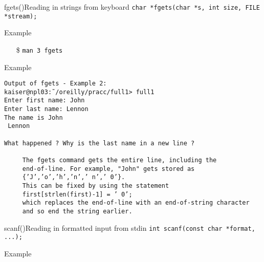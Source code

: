 \begin{frame}[fragile=singleslide]{fgets()}{Reading in strings from keyboard}
  \texttt{char *fgets(char *s, int size, FILE *stream);}
  \begin{block}{Example}
    \begin{center}
    \end{center}
  \end{block}
  \begin{itemize}
  \item[\$] \texttt{man 3 fgets}
  \end{itemize}
\end{frame}

\begin{frame}
  \begin{block}{Example}
    \begin{center}
    \end{center}
  \end{block}
\end{frame}

\begin{verbatim}
Output of fgets - Example 2:
kaiser@npl03:˜/oreilly/pracc/full1> full1
Enter first name: John
Enter last name: Lennon
The name is John
 Lennon

What happened ? Why is the last name in a new line ?

     The fgets command gets the entire line, including the
     end-of-line. For example, "John" gets stored as
     {’J’,’o’,’h’,’n’,’ n’,’ 0’}.
     This can be fixed by using the statement
     first[strlen(first)-1] = ’ 0’;
     which replaces the end-of-line with an end-of-string character
     and so end the string earlier.
\end{verbatim}

\begin{frame}[fragile=singleslide]{scanf()}{Reading in formatted input from stdin}
  \texttt{int scanf(const char *format, ...);}
  \begin{block}{Example}
    \begin{center}
    \end{center}
  \end{block}
\end{frame}

